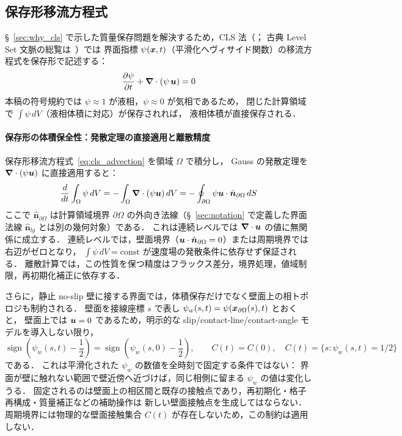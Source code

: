 \subsection{保存形移流方程式}
\label{sec:cls_advection}

§~\ref{sec:why_cls} で示した質量保存問題を解決するため，CLS 法（\cite{OlssonKreiss2005}；
古典 Level Set 文脈の総覧は~\cite{OsherFedkiw2003}）では
界面指標 $\psi(\bm{x}, t)$（平滑化ヘヴィサイド関数）の移流方程式を保存形で記述する：
\begin{equation}
  \dfrac{\partial \psi}{\partial t} + \bm{\nabla}\cdot(\psi\,\bm{u}) = 0
  \label{eq:cls_advection}
\end{equation}
本稿の符号規約では $\psi\approx1$ が液相，$\psi\approx0$ が気相であるため，
閉じた計算領域で $\int \psi \, dV$（液相体積に対応）が保存されれば，
液相体積が直接保存される．

\paragraph{保存形の体積保全性：発散定理の直接適用と離散精度}
保存形移流方程式~\eqref{eq:cls_advection} を領域 $\Omega$ で積分し，
Gauss の発散定理を $\bm{\nabla}\cdot(\psi\bm{u})$ に直接適用すると：
\[
  \frac{d}{dt}\int_\Omega\psi\,dV
  = -\int_\Omega\bm{\nabla}\cdot(\psi\bm{u})\,dV
  = -\oint_{\partial\Omega}\psi\bm{u}\cdot\hat{\bm n}_{\partial\Omega}\,dS
\]
ここで $\hat{\bm n}_{\partial\Omega}$ は計算領域境界 $\partial\Omega$ の外向き法線（§~\ref{sec:notation} で定義した界面法線 $\hat{\bm n}_{lg}$ とは別の幾何対象）である．
これは連続レベルでは $\bm{\nabla}\cdot\bm{u}$ の値に無関係に成立する．
連続レベルでは，壁面境界（$\bm{u}\cdot\hat{\bm n}_{\partial\Omega}=0$）または周期境界では右辺がゼロとなり，
$\int\psi\,dV = \text{const}$ が速度場の発散条件に依存せず保証される．
離散計算では，この性質を保つ精度はフラックス差分，境界処理，値域制限，再初期化補正に依存する．

さらに，静止 no-slip 壁に接する界面では，体積保存だけでなく壁面上の相トポロジも制約される．
壁面を接線座標 $s$ で表し $\psi_w(s,t)=\psi(\bm{x}_{\partial\Omega}(s),t)$ とおくと，
壁面上では $\bm{u}=0$ であるため，明示的な slip/contact-line/contact-angle モデルを導入しない限り，
\begin{equation}
  \operatorname{sign}\!\left(\psi_w(s,t)-\frac12\right)
  =
  \operatorname{sign}\!\left(\psi_w(s,0)-\frac12\right),
  \qquad
  C(t)=C(0),\quad
  C(t)=\{s:\psi_w(s,t)=1/2\}
  \label{eq:wall_phase_topology_invariant}
\end{equation}
である．
これは平滑化された $\psi_w$ の数値を全時刻で固定する条件ではない：
界面が壁に触れない範囲で壁近傍へ近づけば，同じ相側に留まる $\psi_w$ の値は変化しうる．
固定されるのは壁面上の相区間と既存の接触点であり，再初期化・格子再構成・質量補正などの補助操作は
新しい壁面接触点を生成してはならない．
周期境界には物理的な壁面接触集合 $C(t)$ が存在しないため，この制約は適用しない．

